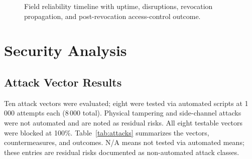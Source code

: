 \documentclass[a4paper,fleqn]{cas-dc}
\begin{document}
\begin{figure}[t]
{}
\caption{Field reliability timeline with uptime, disruptions, revocation propagation, and post-revocation access-control outcome.}
\label{fig:field_timeline}
\end{figure}



\section{Security Analysis}
\label{sec:security}

\subsection{Attack Vector Results}
\label{subsec:attacks}

Ten attack vectors were evaluated; eight were tested via automated
scripts at 1\,000 attempts each (8\,000 total). Physical tampering and
side-channel attacks were not automated and are noted as residual risks.
All eight testable vectors were blocked at 100\%. Table~\ref{tab:attacks}
summarizes the vectors, countermeasures, and outcomes. N/A means not
tested via automated means; these entries are residual risks documented
as non-automated attack classes.
\end{document}
